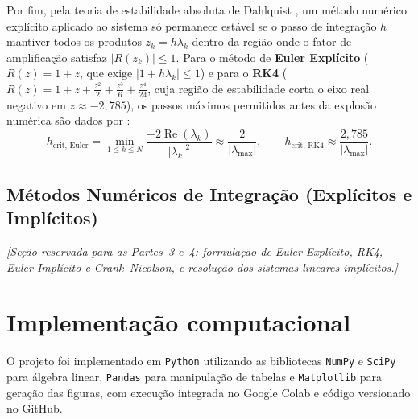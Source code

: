 \documentclass[12pt,a4paper]{article}
\begin{document}
Por fim, pela teoria de estabilidade absoluta de Dahlquist \cite{hairer1996,burden2016}, um método numérico explícito aplicado ao sistema só permanece estável se o passo de integração $h$ mantiver todos os produtos $z_k = h\lambda_k$ dentro da região onde o fator de amplificação satisfaz $|R(z_k)| \le 1$. Para o método de \textbf{Euler Explícito} ($R(z) = 1 + z$, que exige $|1 + h\lambda_k| \le 1$) e para o \textbf{RK4} ($R(z) = 1 + z + \frac{z^2}{2} + \frac{z^3}{6} + \frac{z^4}{24}$, cuja região de estabilidade corta o eixo real negativo em $z \approx -2{,}785$), os passos máximos permitidos antes da explosão numérica são dados por \cite{burden2016,hairer1996}:
\begin{equation}
    h_{\text{crit, Euler}} = \min_{1 \le k \le N} \frac{-2\operatorname{Re}(\lambda_k)}{|\lambda_k|^2} \approx \frac{2}{|\lambda_{\max}|}, \qquad
    h_{\text{crit, RK4}} \approx \frac{2{,}785}{|\lambda_{\max}|}.
    \label{eq:h_crit}
\end{equation}

\subsection{Métodos Numéricos de Integração (Explícitos e Implícitos)}
\textit{[Seção reservada para as Partes~3 e~4: formulação de Euler Explícito, RK4, Euler Implícito e Crank--Nicolson, e resolução dos sistemas lineares implícitos.]}

\section{Implementação computacional}

O projeto foi implementado em \texttt{Python} utilizando as bibliotecas \texttt{NumPy} e \texttt{SciPy} para álgebra linear, \texttt{Pandas} para manipulação de tabelas e \texttt{Matplotlib} para geração das figuras, com execução integrada no Google Colab e código versionado no GitHub.
\end{document}
